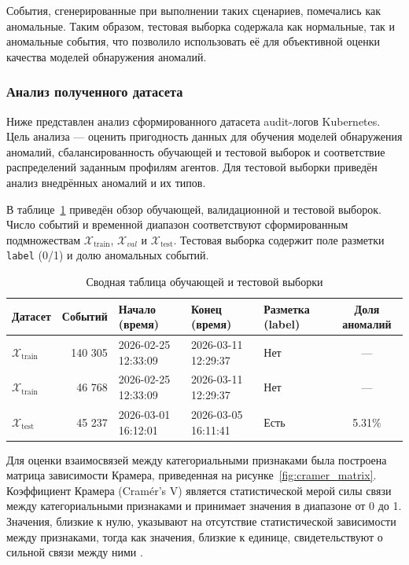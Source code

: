 События, сгенерированные при выполнении таких сценариев, помечались как аномальные. Таким образом, тестовая выборка содержала как нормальные, так и аномальные события, что позволило использовать её для объективной оценки качества моделей обнаружения аномалий.

\subsubsection{Анализ полученного датасета}

Ниже представлен анализ сформированного датасета audit-логов Kubernetes. Цель анализа --- оценить пригодность данных для обучения моделей обнаружения аномалий, сбалансированность обучающей и тестовой выборок и соответствие распределений заданным профилям агентов. Для тестовой выборки приведён анализ внедрённых аномалий и их типов.

В таблице~\ref{tab:datasets} приведён обзор обучающей, валидационной и тестовой выборок. Число событий и временной диапазон соответствуют сформированным подмножествам $\mathcal{X}_{\mathrm{train}}$, $\mathcal{X}_{val}$ и $\mathcal{X}_{\mathrm{test}}$. Тестовая выборка содержит поле разметки \texttt{label} (0/1) и долю аномальных событий.

\begin{table}[h]
  \centering
  \caption{Сводная таблица обучающей и тестовой выборки}
  \label{tab:datasets}
  \begin{tabularx}{\textwidth}{|p{2.5cm}|r|X|X|p{2cm}|c|}
    \hline
    Датасет & Событий & Начало (время) & Конец (время) & Разметка (label) & Доля аномалий \\ 
    \hline
    $\mathcal{X}_{\mathrm{train}}$ & 140 305 & 2026-02-25 12:33:09 & 2026-03-11 12:29:37 & Нет & --- \\ 
    \hline
    $\mathcal{X}_{\mathrm{train}}$ & 46 768 & 2026-02-25 12:33:09 & 2026-03-11 12:29:37 & Нет & --- \\ 
    \hline
    $\mathcal{X}_{\mathrm{test}}$   & 45 237  & 2026-03-01 16:12:01 & 2026-03-05 16:11:41 & Есть  & 5.31\% \\ 
    \hline
  \end{tabularx}
\end{table}

Для оценки взаимосвязей между категориальными признаками была построена матрица зависимости Крамера, приведенная на рисунке~\ref{fig:cramer_matrix}. Коэффициент Крамера (Cramér’s V) является статистической мерой силы связи между категориальными признаками и принимает значения в диапазоне от 0 до 1. Значения, близкие к нулю, указывают на отсутствие статистической зависимости между признаками, тогда как значения, близкие к единице, свидетельствуют о сильной связи между ними \cite{Cramer1946}.

